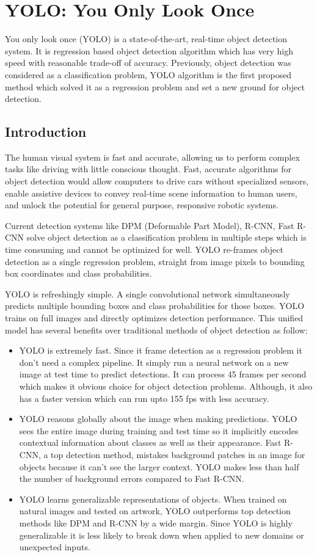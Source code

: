 \chapter{YOLO: You Only Look Once}
You only look once (YOLO) \cite{yolo} is a state-of-the-art, real-time object detection system. It is regression based object detection algorithm which has very high speed with reasonable trade-off of accuracy. Previously, object detection was considered as a classification problem, YOLO algorithm is the first proposed method which solved it as a regression problem and set a new ground for object detection. 

\section{Introduction}
The human visual system is fast and accurate, allowing us to perform complex tasks like driving with little conscious thought. Fast, accurate algorithms for object detection would allow computers to drive cars without specialized sensors, enable assistive devices to convey real-time scene information to human users, and unlock the potential for general purpose, responsive robotic systems.

Current detection systems like DPM \cite{dpm}(Deformable Part Model), R-CNN, Fast R-CNN \cite{fast_rcnn} solve object detection as a classification problem in multiple steps which is time consuming and cannot be optimized for well. YOLO re-frames object detection as a single regression problem, straight from image pixels to bounding box coordinates and class probabilities.

YOLO is refreshingly simple. A single convolutional network simultaneously predicts multiple bounding boxes and class probabilities for those boxes. YOLO trains on full images and directly optimizes detection performance. This unified model has several benefits over traditional methods of object detection as follow:
\begin{itemize}
    \item YOLO is extremely fast. Since it frame detection
as a regression problem it don’t need a complex pipeline. It simply run a neural network on a new image at test
time to predict detections. It can process 45 frames per second which makes it obvious choice for object detection problems. Although, it also has a faster version which can run upto 155 fps with less accuracy.
    \item YOLO reasons globally about the image when making predictions. YOLO sees the entire image during training and test time so it implicitly encodes contextual information about classes as well as their appearance. Fast R-CNN, a top detection method, mistakes background patches in an image for objects because it can’t see the larger context. YOLO makes less than half the number of background errors compared to Fast R-CNN.
    \item YOLO learns generalizable representations of objects. When trained on natural images and tested on artwork, YOLO outperforms top detection methods like DPM and R-CNN by a wide margin. Since YOLO is highly generalizable it is less likely to break down when applied to new domains or unexpected inputs.
\end{itemize}

